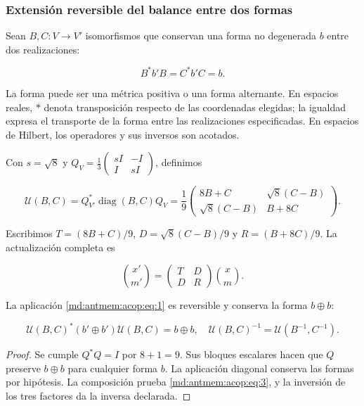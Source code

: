 \subsubsection{Extensión reversible del balance entre dos formas}

Sean \(B,C:V\to V'\) isomorfismos que conservan una forma no degenerada \(b\) entre dos realizaciones:

\[
B^*b'B=C^*b'C=b.
\]

La forma puede ser una métrica positiva o una forma alternante. En espacios reales, \(*\) denota transposición respecto de las coordenadas elegidas; la igualdad expresa el transporte de la forma entre las realizaciones especificadas. En espacios de Hilbert, los operadores y sus inversos son acotados.

Con \(s=\sqrt8\) y \(Q_V=\frac13\left(\begin{smallmatrix}sI&-I\\I&sI\end{smallmatrix}\right)\), definimos

\begin{equation}
\boxed{
\mathcal U(B,C)=Q_{V'}^*\operatorname{diag}(B,C)Q_V
=\frac19\begin{pmatrix}8B+C&\sqrt8(C-B)\\\sqrt8(C-B)&B+8C\end{pmatrix}.}
\label{md:antmem:acop:eq:1}
\end{equation}

Escribimos \(T=(8B+C)/9\), \(D=\sqrt8(C-B)/9\) y \(R=(B+8C)/9\). La actualización completa es

\begin{equation}
\binom{x'}{m'}=\begin{pmatrix}T&D\\D&R\end{pmatrix}\binom{x}{m}.
\label{md:antmem:acop:eq:2}
\end{equation}

\begin{theorem}
La aplicación \eqref{md:antmem:acop:eq:1} es reversible y conserva la forma \(b\oplus b\):

\begin{equation}
\mathcal U(B,C)^*(b'\oplus b')\mathcal U(B,C)=b\oplus b,
\quad\mathcal U(B,C)^{-1}=\mathcal U(B^{-1},C^{-1}).
\label{md:antmem:acop:eq:3}
\end{equation}
\end{theorem}

\begin{proof}
Se cumple \(Q^*Q=I\) por \(8+1=9\). Sus bloques escalares hacen que \(Q\) preserve \(b\oplus b\) para cualquier forma \(b\). La aplicación diagonal conserva las formas por hipótesis. La composición prueba \eqref{md:antmem:acop:eq:3}, y la inversión de los tres factores da la inversa declarada.
\end{proof}

